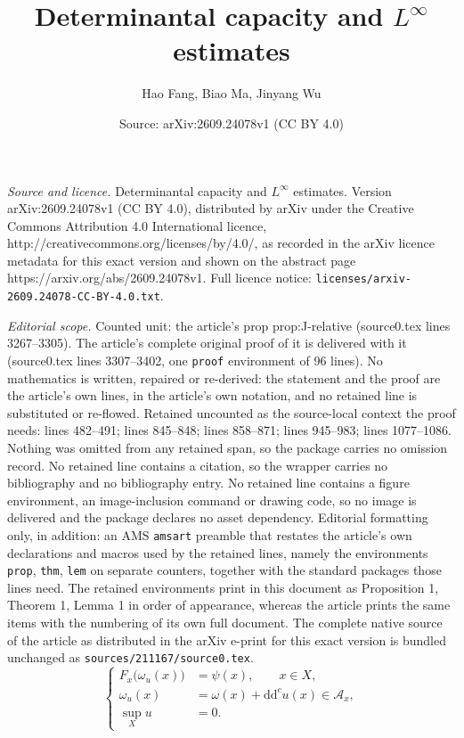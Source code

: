 \documentclass[10pt,a4paper]{amsart}
\title{Determinantal capacity and $L^\infty$ estimates}
\author{Hao Fang, Biao Ma, Jinyang Wu}
\date{Source: arXiv:2609.24078v1 (CC BY 4.0)}
\renewcommand{\d}{\mathrm{d}}
\newcommand{\ddc}{\d\d^c}
\begin{document}
\maketitle

\noindent\emph{Source and licence.} Determinantal capacity and $L^\infty$ estimates. Version arXiv:2609.24078v1 (CC BY 4.0), distributed by arXiv under the Creative Commons Attribution 4.0 International licence, http://creativecommons.org/licenses/by/4.0/, as recorded in the arXiv licence metadata for this exact version and shown on the abstract page https://arxiv.org/abs/2609.24078v1. Full licence notice: \texttt{licenses/arxiv-2609.24078-CC-BY-4.0.txt}.\par\smallskip

\noindent\textit{Editorial scope.} Counted unit: the article's prop prop:J-relative (source0.tex lines 3267--3305). The article's complete original proof of it is delivered with it (source0.tex lines 3307--3402, one \texttt{proof} environment of 96 lines). No mathematics is written, repaired or re-derived: the statement and the proof are the article's own lines, in the article's own notation, and no retained line is substituted or re-flowed.  Retained uncounted as the source-local context the proof needs: lines 482--491; lines 845--848; lines 858--871; lines 945--983; lines 1077--1086.  Nothing was omitted from any retained span, so the package carries no omission record.  No retained line contains a citation, so the wrapper carries no bibliography and no bibliography entry.  No retained line contains a figure environment, an image-inclusion command or drawing code, so no image is delivered and the package declares no asset dependency.  Editorial formatting only, in addition: an AMS \texttt{amsart} preamble that restates the article's own declarations and macros used by the retained lines, namely the environments \texttt{prop}, \texttt{thm}, \texttt{lem} on separate counters, together with the standard packages those lines need.  The retained environments print in this document as Proposition 1, Theorem 1, Lemma 1 in order of appearance, whereas the article prints the same items with the numbering of its own full document.  The complete native source of the article as distributed in the arXiv e-print for this exact version is bundled unchanged as \texttt{sources/211167/source0.tex}.
\begin{equation}
	\label{eq:main-equation}
	\left\{
	\begin{aligned}
		F_x\bigl(\omega_u(x)\bigr)&=\psi(x),\qquad x\in X,\\
		\omega_u(x)&=\omega(x)+\ddc u(x)\in\mathcal A_x,\\
		\sup_Xu&=0.
	\end{aligned}
	\right.
\end{equation}
\end{document}

